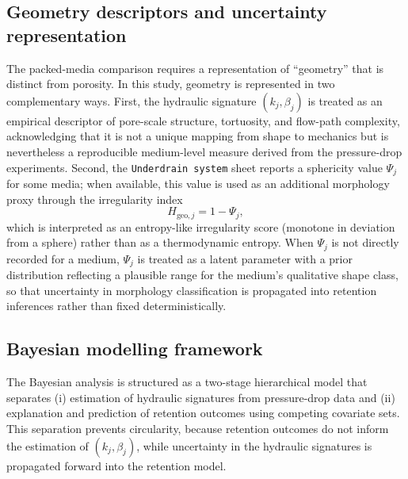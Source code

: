 \documentclass[12pt,a4paper]{article}
\begin{document}
\subsection{Geometry descriptors and uncertainty representation}
The packed-media comparison requires a representation of ``geometry'' that is distinct from porosity. In this study, geometry is represented in two complementary ways. First, the hydraulic signature $(k_j,\beta_j)$ is treated as an empirical descriptor of pore-scale structure, tortuosity, and flow-path complexity, acknowledging that it is not a unique mapping from shape to mechanics but is nevertheless a reproducible medium-level measure derived from the pressure-drop experiments. Second, the \texttt{Underdrain system} sheet reports a sphericity value $\Psi_j$ for some media; when available, this value is used as an additional morphology proxy through the irregularity index
\begin{equation}
H_{\mathrm{geo},j} = 1-\Psi_j,
\end{equation}
which is interpreted as an entropy-like irregularity score (monotone in deviation from a sphere) rather than as a thermodynamic entropy. When $\Psi_j$ is not directly recorded for a medium, $\Psi_j$ is treated as a latent parameter with a prior distribution reflecting a plausible range for the medium's qualitative shape class, so that uncertainty in morphology classification is propagated into retention inferences rather than fixed deterministically.

\subsection{Bayesian modelling framework}
The Bayesian analysis is structured as a two-stage hierarchical model that separates (i) estimation of hydraulic signatures from pressure-drop data and (ii) explanation and prediction of retention outcomes using competing covariate sets. This separation prevents circularity, because retention outcomes do not inform the estimation of $(k_j,\beta_j)$, while uncertainty in the hydraulic signatures is propagated forward into the retention model.
\end{document}
